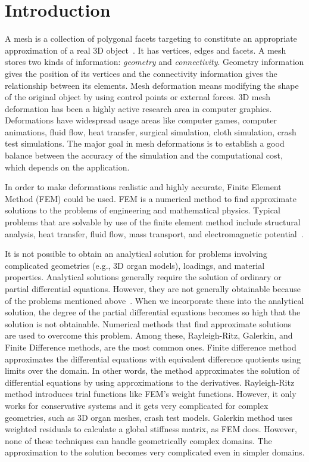 \chapter{Introduction}
\label{chapter1}

A mesh is a collection of polygonal facets targeting to constitute an appropriate approximation of a real 3D object~\cite{Muller2007}. It has vertices, edges and facets. A mesh stores two kinds of information: \textit{geometry} and \textit{connectivity}. Geometry information gives the position of its vertices and the connectivity information gives the relationship between its elements. Mesh deformation means modifying the shape of the original object by using control points or external forces. 3D mesh deformation has been a highly active research area in computer graphics. Deformations have widespread usage areas like computer games, computer animations, fluid flow, heat transfer, surgical simulation, cloth simulation, crash test simulations. The major goal in mesh deformations is to establish a good balance between the accuracy of the simulation and the computational cost, which depends on the application.

In order to make deformations realistic and highly accurate, Finite Element Method (FEM) could be used. FEM is a numerical method to find approximate solutions to the problems of engineering and mathematical physics. Typical problems that are solvable by use of the finite element method include structural analysis, heat transfer, fluid flow, mass transport, and electromagnetic potential~\cite{Logan07}.

It is not possible to obtain an analytical solution for problems involving complicated geometries (e.g., 3D organ models), loadings, and material properties. Analytical solutions generally require the solution of ordinary or partial differential equations. However, they are not generally obtainable because of the problems mentioned above~\cite{Logan07}. When we incorporate these into the analytical solution, the degree of the partial differential equations becomes so high that the solution is not obtainable. Numerical methods that find approximate solutions are used to overcome this problem. Among these, Rayleigh-Ritz, Galerkin, and Finite Difference methods, are the most common ones. Finite difference method approximates the differential equations with equivalent difference quotients using limits over the domain. In other words, the method approximates the solution of differential equations by using approximations to the derivatives. Rayleigh-Ritz method introduces trial functions like FEM's weight functions. However, it only works for conservative systems and it gets very complicated for complex geometries, such as 3D organ meshes, crash test models. Galerkin method uses weighted residuals to calculate a global stiffness matrix, as FEM does. However, none of these techniques can handle geometrically complex domains. The approximation to the solution becomes very complicated even in simpler domains.

